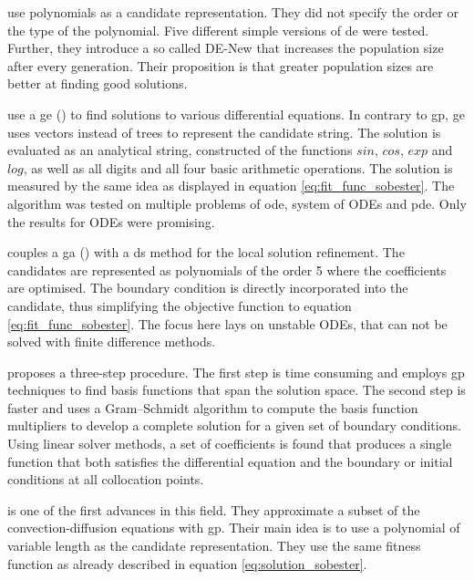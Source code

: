 \documentclass[./\jobname.tex,hidelinks]{subfiles}
\begin{document}
\cite{panagant_solving_2014} use polynomials as a candidate representation. They did not specify the order or the type of the polynomial. Five different simple versions of \gls{de} were tested. Further, they introduce a so called DE-New that increases the population size after every generation. Their proposition is that greater population sizes are better at finding good solutions. 

\cite{tsoulos_solving_2006} use a \gls{ge} (\cite{ryan_grammatical_1998}) to find solutions to various differential equations. In contrary to \gls{gp}, \gls{ge} uses vectors instead of trees to represent the candidate string. The solution is evaluated as an analytical string, constructed of the functions $sin$, $cos$, $exp$ and $log$, as well as all digits and all four basic arithmetic operations. The solution is measured by the same idea as displayed in equation \ref{eq:fit_func_sobester}. The algorithm was tested on multiple problems of \gls{ode}, system of ODEs and \gls{pde}. Only the results for ODEs were promising. 

\cite{mastorakis_unstable_2006} couples a \gls{ga} (\cite{goldberg_messy_1989}) with a \gls{ds} method for the local solution refinement. The candidates are represented as polynomials of the order 5 where the coefficients are optimised. The boundary condition is directly incorporated into the candidate, thus simplifying the objective function to equation \ref{eq:fit_func_sobester}. The focus here lays on unstable ODEs, that can not be solved with finite difference methods. 

\cite{kirstukas_hybrid_2005} proposes a three-step procedure. The first step is time consuming and employs \gls{gp} techniques to find basis functions that span the solution space. The second step is faster and uses a Gram–Schmidt algorithm to compute the basis function multipliers to develop a complete solution for a given set of boundary conditions. Using linear solver methods, a set of coefficients is found that produces a single function that both satisfies the differential equation and the boundary or initial conditions at all collocation points. 

\cite{howard_genetic_2001} is one of the first advances in this field. They approximate a subset of the convection-diffusion equations with \gls{gp}. Their main idea is to use a polynomial of variable length as the candidate representation. They use the same fitness function as already described in equation \ref{eq:solution_sobester}. 
\end{document}
